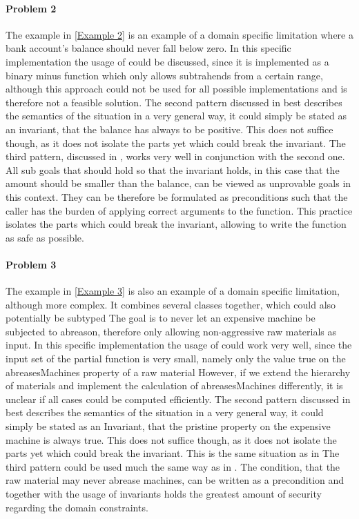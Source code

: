 \paragraph{Problem 2} \label{Problem 2}
The example in \ref{Example 2} is an example of a domain specific limitation where a bank account's balance should never fall below zero. In this specific implementation the usage of  could be discussed, since it is implemented as a binary minus function which only allows subtrahends from a certain range, although this approach could not be used for all possible implementations and is therefore not a feasible solution. \newline
The second pattern discussed in  best describes the semantics of the situation in a very general way, it could simply be stated as an invariant, that the balance has always to be positive. This does not suffice though, as it does not isolate the parts yet which could break the invariant. \newline
The third pattern, discussed in , works very well in conjunction with the second one. All sub goals that should hold so that the invariant holds, in this case that the amount should be smaller than the balance, can be viewed as unprovable goals in this context. They can be therefore be formulated as preconditions such that the caller has the burden of applying correct arguments to the function. This practice isolates the parts which could break the invariant, allowing to write the function as safe as possible.

\paragraph{Problem 3}
The example in \ref{Example 3} is also an example of a domain specific limitation, although more complex. It combines several classes together, which could also potentially be subtyped The goal is to never let an expensive machine be subjected to abreason, therefore only allowing non-aggressive raw materials as input. In this specific implementation the usage of  could work very well, since the input set of the partial function is very small, namely only the value true on the abreasesMachines property of a raw material However, if we extend the hierarchy of materials and implement the calculation of abreasesMachines differently, it is unclear if all cases could be computed efficiently. \newline
The second pattern discussed in  best describes the semantics of the situation in a very general way, it could simply be stated as an Invariant, that the pristine property on the expensive machine is always true. This does not suffice though, as it does not isolate the parts yet which could break the invariant. This is the same situation as in  \newline
The third pattern could be used much the same way as in . The condition, that the raw material may never abrease machines, can be written as a precondition and together with the usage of invariants holds the greatest amount of security regarding the domain constraints.

